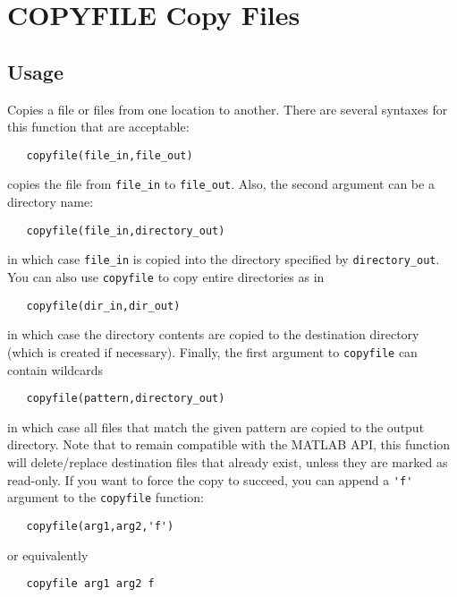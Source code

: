 \section{COPYFILE Copy Files}

\subsection{Usage}

Copies a file or files from one location to another.  There are 
several syntaxes for this function that are acceptable:
\begin{verbatim}
   copyfile(file_in,file_out)
\end{verbatim}
copies the file from \verb|file_in| to \verb|file_out|.  Also, the second
argument can be a directory name:
\begin{verbatim}
   copyfile(file_in,directory_out)
\end{verbatim}
in which case \verb|file_in| is copied into the directory specified by
\verb|directory_out|.  You can also use \verb|copyfile| to copy entire directories
as in
\begin{verbatim}
   copyfile(dir_in,dir_out)
\end{verbatim}
in which case the directory contents are copied to the destination directory
(which is created if necessary).  Finally, the first argument to \verb|copyfile| can
contain wildcards
\begin{verbatim}
   copyfile(pattern,directory_out)
\end{verbatim}
in which case all files that match the given pattern are copied to the output
directory.   Note that to remain compatible with the MATLAB API, this function
will delete/replace destination files that already exist, unless they are marked
as read-only.  If you want to force the copy to succeed, you can append a \verb|'f'|
argument to the \verb|copyfile| function:
\begin{verbatim}
   copyfile(arg1,arg2,'f')
\end{verbatim}
or equivalently
\begin{verbatim}
   copyfile arg1 arg2 f
\end{verbatim}
